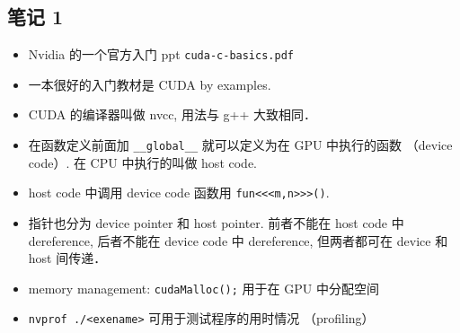 

\subsection{笔记 1}
\begin{itemize}
\item Nvidia 的一个官方入门 ppt \verb|cuda-c-basics.pdf|
\item 一本很好的入门教材是 CUDA by examples.
\item CUDA 的编译器叫做 nvcc, 用法与 g++ 大致相同．
\item 在函数定义前面加 \verb`__global__` 就可以定义为在 GPU 中执行的函数 （device code）. 在 CPU 中执行的叫做 host code.
\item host code 中调用 device code 函数用 \verb`fun<<<m,n>>>()`.
\item 指针也分为 device pointer 和 host pointer. 前者不能在 host code 中 dereference, 后者不能在 device code 中 dereference, 但两者都可在 device 和 host 间传递．
\item memory management:
\verb`cudaMalloc();` 用于在 GPU 中分配空间
\item \verb`nvprof ./<exename>` 可用于测试程序的用时情况 （profiling）
\end{itemize}

